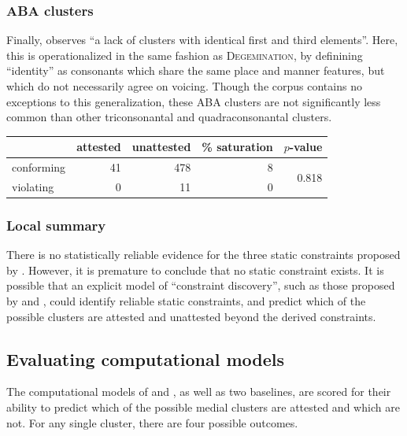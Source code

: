 \subsubsection{ABA clusters}

Finally, \citet[][176]{Pierrehumbert1994} observes ``a lack of clusters with identical first and third elements''. Here, this is operationalized in the same fashion as \textsc{Degemination}, by definining ``identity'' as consonants which share the same place and manner features, but which do not necessarily agree on voicing. Though the corpus contains no exceptions to this generalization, these \textsc{ABA} clusters are not significantly less common than other triconsonantal and quadraconsonantal clusters.

\begin{example}
\begin{tabular}{l r r r r}
\toprule
           & attested & unattested & \% saturation & $p$-value \\
\midrule
conforming & 41       & 478        & 8             & \multirow{2}{*}{0.818} \\
violating  &  0       &  11        & 0             \\
\bottomrule
\end{tabular}
\end{example}

\subsubsection{Local summary}

There is no statistically reliable evidence for the three static constraints proposed by \citeauthor{Pierrehumbert1994}. However, it is premature to conclude that no static constraint exists. It is possible that an explicit model of ``constraint discovery'', such as those proposed by \citet{Pierrehumbert1994} and \citet{Hayes2008a}, could identify reliable static constraints, and predict which of the possible clusters are attested and unattested beyond the derived constraints. 

\subsection{Evaluating computational models}

The computational models of \citeauthor{Pierrehumbert1994} and \citeauthor{Hayes2008a}, as well as two baselines, are scored for their ability to predict which of the possible medial clusters are attested and which are not. For any single cluster, there are four possible outcomes.

